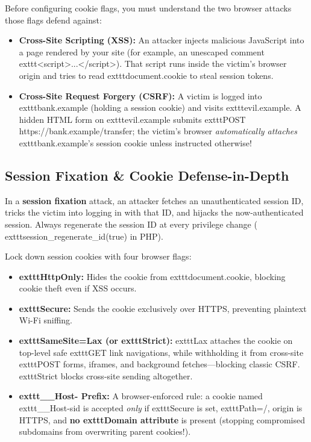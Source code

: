 Before configuring cookie flags, you must understand the two browser attacks those flags defend against:
\begin{itemize}[leftmargin=15pt]
  \item \textbf{Cross-Site Scripting (XSS):} An attacker injects malicious JavaScript into a page rendered by your site (for example, an unescaped comment 	exttt{<script>...</script>}). That script runs inside the victim's browser origin and tries to read 	exttt{document.cookie} to steal session tokens.
  \item \textbf{Cross-Site Request Forgery (CSRF):} A victim is logged into 	exttt{bank.example} (holding a session cookie) and visits 	exttt{evil.example}. A hidden HTML form on 	exttt{evil.example} submits 	exttt{POST https://bank.example/transfer}; the victim's browser \emph{automatically attaches} 	exttt{bank.example}'s session cookie unless instructed otherwise!
\end{itemize}

\subsection{Session Fixation \protect\& Cookie Defense-in-Depth}

In a \textbf{session fixation} attack, an attacker fetches an unauthenticated session ID, tricks the victim into logging in with that ID, and hijacks the now-authenticated session. Always regenerate the session ID at every privilege change (	exttt{session\_regenerate\_id(true)} in PHP).

Lock down session cookies with four browser flags:
\begin{itemize}[leftmargin=15pt]
  \item \textbf{	exttt{HttpOnly}:} Hides the cookie from 	exttt{document.cookie}, blocking cookie theft even if XSS occurs.
  \item \textbf{	exttt{Secure}:} Sends the cookie exclusively over HTTPS, preventing plaintext Wi-Fi sniffing.
  \item \textbf{	exttt{SameSite=Lax} (or 	exttt{Strict}):} 	exttt{Lax} attaches the cookie on top-level safe 	exttt{GET} link navigations, while withholding it from cross-site 	exttt{POST} forms, iframes, and background fetches---blocking classic CSRF. 	exttt{Strict} blocks cross-site sending altogether.
  \item \textbf{	exttt{\_\_Host-} Prefix:} A browser-enforced rule: a cookie named 	exttt{\_\_Host-sid} is accepted \emph{only} if 	exttt{Secure} is set, 	exttt{Path=/}, origin is HTTPS, and \textbf{no 	exttt{Domain} attribute} is present (stopping compromised subdomains from overwriting parent cookies!).
\end{itemize}

